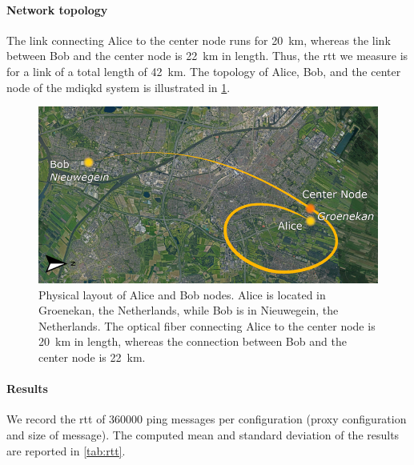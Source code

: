 \paragraph{Network topology}

The link connecting Alice to the center node runs for \qty{20}{\km}, whereas the link between Bob
and the center node is \qty{22}{\km} in length. Thus, the \acrshort{rtt} we measure is for a link of
a total length of \qty{42}{\km}. The topology of Alice, Bob, and the center node of the
\acrshort{mdiqkd} system is illustrated in \cref{fig:mac-setup-qkd-locations}.

\begin{figure}[t]
    \centering
    \includegraphics[width=0.6\linewidth]{figures/mac-setup-qkd-locations-resized.png}
    \caption{
        Physical layout of Alice and Bob nodes. Alice is located in Groenekan, the Netherlands,
        while Bob is in Nieuwegein, the Netherlands. The optical fiber connecting Alice to the
        center node is \qty{20}{\km} in length, whereas the connection between Bob and the center
        node is \qty{22}{\km}.
    }
    \label{fig:mac-setup-qkd-locations}
\end{figure}

\paragraph{Results}

We record the \acrlong{rtt} of \num{360000} ping messages per configuration (proxy configuration and
size of message). The computed mean and standard deviation of the results are reported in
\cref{tab:rtt}.

